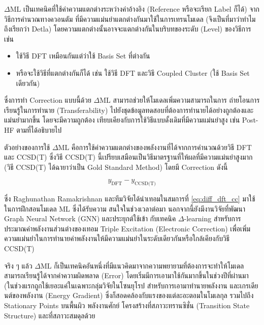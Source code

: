 $\Delta\text{ML}$ เป็นเทคนิคที่ใช้ค่าความแตกต่างระหว่างค่าอ้างอิง (Reference หรือจะเรียก Label ก็ได้) จากวิธีการคำนวณทางควอนตัม%
ที่มีความแม่นยำแตกต่างกันมาใช้ในการเทรนโมเดล (จึงเป็นที่มาว่าทำไมถึงเรียกว่า Detla) โดยความแตกต่างนั้นอาจจะแตกต่างกันในบริบทของระดับ 
(Level) ของวิธีการ เช่น

\begin{itemize}
    \item ใช้วิธี DFT เหมือนกันแต่ว่าใช้ Basis Set ที่ต่างกัน
    
    \item  หรือจะใช้วิธีที่แตกต่างกันก็ได้ เช่น ใช้วิธี DFT และวิธี Coupled Cluster (ใช้ Basis Set เดียวกัน)
\end{itemize}

ซึ่งการทำ Correction แบบนี้ด้วย $\Delta\text{ML}$ สามารถช่วยให้โมเดลเพิ่มความสามารถในการ%
ถ่ายโอนการเรียนรู้ในการทำนาย (Transferability) ไปยังชุดข้อมูลทดสอบที่ต้องการทำนายได้อย่างถูกต้องและแม่นยำมากขึ้น โดยจะมีความถูกต้อง%
เทียบเคียงกับการใช้วิธีแบบดั้งเดิมที่มีความแม่นยำสูง เช่น Post-HF ตามที่ได้อธิบายไป 

ตัวอย่างของการใช้ $\Delta\text{ML}$ คือการใช้ค่าความแตกต่างของพลังงานที่ได้จากการคำนวณด้วยวิธี DFT และ CCSD(T) ซึ่งวิธี CCSD(T) 
นี้เปรียบเสมือนเป็นวิธีมาตรฐานที่ให้ผลที่มีความแม่นยำสูงมาก (วิธี CCSD(T) ได้ฉายาว่าเป็น Gold Standard Method) โดยมี Correction ดังนี้

\begin{equation}\label{eq:diff_dft_cc}
    y_{\text{DFT}} - y_{\text{CCSD(T)}}
\end{equation}

ซึ่ง Raghunathan Ramakrishnan และทีมวิจัยได้นำเทอมในสมการที่ \ref{eq:diff_dft_cc} มาใช้ในการฝึกสอนโมเดล ML ซึ่งได้รับความ%
สนใจในช่วงเวลาต่อมา\autocite{ramakrishnan2015a} นอกจากนี้ยังมีงานวิจัยที่พัฒนา Graph Neural Network (GNN) และประยุกต์ใช้เข้า%
กับเทคนิค $\Delta$-learning สำหรับการประมาณค่าพลังงานส่วนต่างของเทอม Triple Excitation (Electronic Correction) 
เพื่อเพิ่มความแม่นยำในการทำนายค่าพลังงานให้มีความแม่นยำในระดับเดียวกันหรือใกล้เคียงกับวิธี CCSD(T)\autocite{ruth2022}

จริง ๆ แล้ว $\Delta\text{ML}$ ก็เป็นเทคนิคอันหนึ่งที่มีแนวคิดมาจากความพยายามที่ต้องการจะทำให้โมเดลสามารถเรียนรู้ได้จากค่าความผิดพลาด 
(Error) โดยเริ่มมีการเอามาใช้กันมากขึ้นในช่วงปีที่ผ่านมา (ในช่วงแรกถูกใช้เยอะแค่ในเฉพาะกลุ่มวิจัยในโซนยุโรป สำหรับการเอามาทำนายพลังงาน%
และเกรเดียนต์ของพลังงาน (Energy Gradient) ซึ่งก็สอดคล้องกับแรงของแต่ละอะตอมในโมเลกุล รวมไปถึง Stationary Points บนพื้นผิว%
พลังงานศักย์ โครงสร้างที่สภาวะทรานซิชั่น (Transition State Structure) และที่สภาวะสมดุลด้วย

